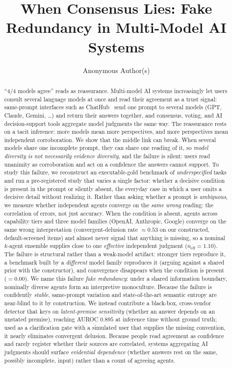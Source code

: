 \documentclass[acmsmall,screen,review,anonymous]{acmart}
\newcommand{\neff}{\ensuremath{n_{\mathrm{eff}}}}
\begin{document}
\title[When Consensus Lies]{When Consensus Lies: Fake Redundancy in Multi-Model AI Systems}

\author{Anonymous Author(s)}

\begin{abstract}
``$4/4$ models agree'' reads as reassurance. Multi-model AI systems increasingly let users consult several
language models at once and read their agreement as a trust signal: same-prompt interfaces such as
ChatHub~\cite{chathub2026} send one prompt to several models (GPT, Claude, Gemini, \dots) and return their
answers together, and consensus, voting, and AI decision-support tools aggregate model judgments the same way.
The reassurance rests on a tacit inference: more models mean more perspectives, and more perspectives mean
independent corroboration. We show that the middle link can break. When several models share one incomplete
prompt, they can share one reading of it, so \emph{model diversity is not necessarily evidence diversity}, and
the failure is silent: users read unanimity as corroboration and act on a confidence the answers cannot
support.
To study this failure, we reconstruct an executable-gold benchmark of \emph{underspecified} tasks and run a
pre-registered study that varies a single factor: whether a decisive condition is present in the prompt or
silently absent, the everyday case in which a user omits a decisive detail without realizing it. Rather than
asking whether a prompt is \emph{ambiguous}, we measure whether independent agents converge on the \emph{same
wrong} reading: the correlation of errors, not just accuracy. When the condition is absent, agents across
capability tiers and three model families (OpenAI, Anthropic, Google) converge on the same wrong
interpretation (convergent-delusion rate $\approx\!0.53$ on our constructed, default-screened items) and
almost never signal that anything is missing, so a nominal $k$-agent ensemble supplies close to one
\emph{effective} independent judgment ($\neff\!=\!1.10$). The failure is structural rather than a weak-model
artifact: stronger tiers reproduce it, a benchmark built by a \emph{different} model family reproduces it
(arguing against a shared prior with the constructor), and convergence disappears when the condition is
present ($=\!0.00$). We name this failure \emph{fake redundancy}: under a shared information boundary,
nominally diverse agents form an interpretive monoculture.
Because the failure is confidently \emph{stable}, same-prompt variation and state-of-the-art semantic entropy
are near-blind to it by construction. We instead contribute a black-box, cross-vendor detector that keys on
\emph{latent-premise sensitivity} (whether an answer depends on an unstated premise), reaching AUROC $0.895$
at inference time without ground truth; used as a clarification gate with a simulated user that supplies the
missing convention, it nearly eliminates convergent delusion. Because people read agreement as confidence and
rarely register whether their sources are correlated, systems aggregating AI judgments should surface
\emph{evidential dependence} (whether answers rest on the same, possibly incomplete, input) rather than a
count of agreeing agents.
\end{abstract}
\end{document}
